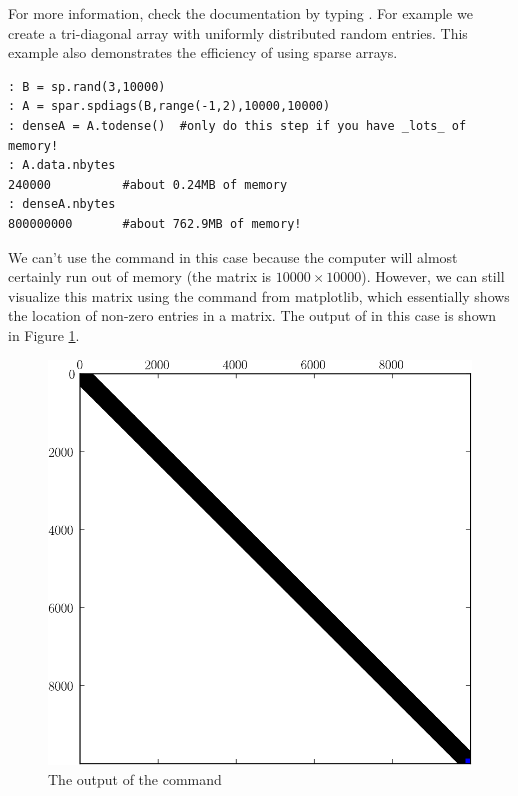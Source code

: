 For more information, check the documentation by typing . 
For example we create a tri-diagonal array with uniformly distributed random entries. 
This example also demonstrates the efficiency of using sparse arrays.
\begin{lstlisting}
: B = sp.rand(3,10000)
: A = spar.spdiags(B,range(-1,2),10000,10000)
: denseA = A.todense()  #only do this step if you have _lots_ of memory!
: A.data.nbytes
240000          #about 0.24MB of memory
: denseA.nbytes
800000000       #about 762.9MB of memory!
\end{lstlisting}
We can't use the  command in this case because the computer will almost 
certainly run out of memory (the matrix is $10000 \times 10000$). 
However, we can still visualize this matrix using the  command from matplotlib, 
which essentially shows the location of non-zero entries in a matrix. 
The output of  in this case is shown in Figure \ref{fig:mpl_spy}.
\begin{figure}[h]
\centering
\includegraphics[width=\textwidth]{spy.pdf}
\caption{The output of the  command}
\label{fig:mpl_spy}
\end{figure}

